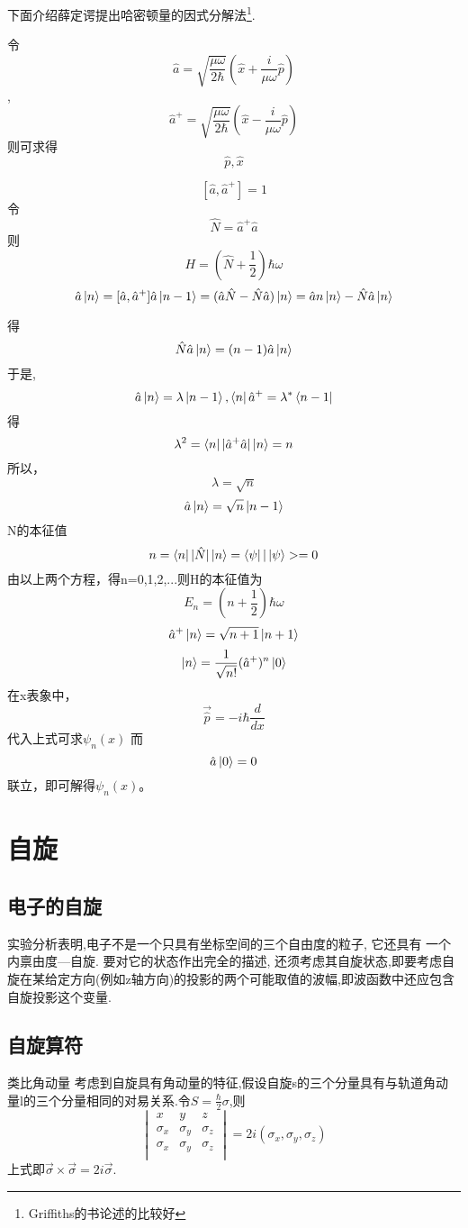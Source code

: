 \documentclass[13pt,a4paper]{article}
\begin{document}
\begin{CJK}{UTF8}{song}
下面介绍薛定谔提出哈密顿量的因式分解法\footnote{Griffiths的书论述的比较好}.

令$$\hat{a}=\sqrt{\frac{\mu\omega}{2\hbar}}(\hat{x}+\frac{i}{\mu\omega}\hat{p})$$,$$\hat{a}^+=\sqrt{\frac{\mu\omega}{2\hbar}}(\hat{x}-\frac{i}{\mu\omega}\hat{p})$$则可求得$$\hat{p},\hat{x}$$

$$[\hat{a},\hat{a}^+]=1$$令$$\hat{N}=\hat{a}^+\hat{a}$$则$$H=(\hat{N}+\frac{1}{2})\hbar\omega$$
$$\hat{a}\ket{n}=[\hat{a},\hat{a}^+]\hat{a}\ket{n-1}=(\hat{a}\hat{N}-\hat{N}\hat{a})\ket{n}=\hat{a}n\ket{n}-\hat{N}\hat{a}\ket{n}$$

得$$\hat{N}\hat{a}\ket{n}=(n-1)\hat{a}\ket{n}$$于是,$$\hat{a}\ket{n}=\lambda\ket{n-1},\bra{n}\hat{a}^+=\lambda^*\bra{n-1}$$得$$\lambda^2=\bra{n}|\hat{a}^+\hat{a}|\ket{n}=n$$所以，$$\lambda=\sqrt{n}$$ $$\hat{a}\ket{n}=\sqrt{n}\ket{n-1}$$ N的本征值$$n=\bra{n}|\hat{N}|\ket{n}=\bra{\psi}|\ket{\psi}>=0$$
由以上两个方程，得n=0,1,2,...则H的本征值为$$E_n=(n+\frac{1}{2})\hbar\omega$$
$$\hat{a}^+\ket{n}=\sqrt{n+1}\ket{n+1}$$
$$\ket{n}=\frac{1}{\sqrt{n!}}(\hat{a}^+)^n\ket{0}$$ 
在x表象中，$$\vec{\hat{p}}=-i\hbar\frac{d}{dx}$$
代入上式可求$\psi_{n}(x)$
而$$\hat{a}\ket{0}=0$$联立，即可解得$\psi_{n}(x)$。




\section{自旋}

\subsection{电子的自旋}
实验分析表明,电子不是一个只具有坐标空间的三个自由度的粒子, 它还具有
一个内禀由度—自旋. 要对它的状态作出完全的描述, 还须考虑其自旋状态,即要考虑自旋在某给定方向(例如z轴方向)的投影的两个可能取值的波幅,即波函数中还应包含自旋投影这个变量.




\subsection{自旋算符}
类比角动量
考虑到自旋具有角动量的特征,假设自旋s的三个分量具有与轨道角动量l的三个分量相同的对易关系.令$S=\frac{\hbar}{2}\sigma$,则$$
\begin{vmatrix}
	x& y & z\\
	\sigma_x&\sigma_y&\sigma_z\\
	\sigma_x&\sigma_y&\sigma_z\\
\end{vmatrix}=2i(\sigma_x,\sigma_y,\sigma_z)$$
上式即$\vec{\sigma}\times\vec{\sigma}=2i\vec{\sigma}$.


\end{CJK}
\end{document}
